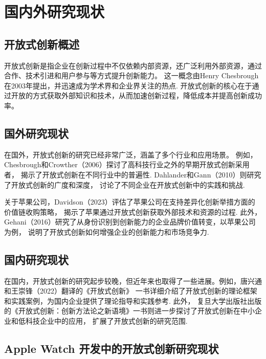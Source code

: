 \chapter{国内外研究现状}

\section{开放式创新概述}

开放式创新是指企业在创新过程中不仅依赖内部资源，还广泛利用外部资源，通过合作、技术引进和用户参与等方式提升创新能力。
这一概念由Henry Chesbrough在2003年提出，并迅速成为学术界和企业界关注的热点\citep{chesbrough_beyond_2006}.
 开放式创新的核心在于通过开放的方式获取外部知识和技术，从而加速创新过程，降低成本并提高创新成功率。

\section{国外研究现状}

在国外，开放式创新的研究已经非常广泛，涵盖了多个行业和应用场景。
例如，Chesbrough和Crowther（2006）探讨了高科技行业之外的早期开放式创新采用者，
揭示了开放式创新在不同行业中的普遍性\citep{chesbrough_beyond_2006}. Dahlander和Gann（2010）则研究了开放式创新的广度和深度，
讨论了不同企业在开放式创新中的实践和挑战\citep{dahlander_how_2010}.

关于苹果公司，Davidson（2023）评估了苹果公司在支持差异化创新举措方面的价值链收购策略，
揭示了苹果通过开放式创新获取外部技术和资源的过程\citep{davidson_assessing_2023}. 
此外，Gehani（2016）研究了从身份识别到创新能力的企业品牌价值转变，以苹果公司为例，
说明了开放式创新如何增强企业的创新能力和市场竞争力\citep{gehani2016corporate}.

\section{国内研究现状}

在国内，开放式创新的研究起步较晚，但近年来也取得了一些进展。例如，唐兴通和王崇锋（2022）翻译的《开放式创新》
一书详细介绍了开放式创新的理论框架和实践案例，为国内企业提供了理论指导和实践参考\citep{chesbrough2022}. 此外，
复旦大学出版社出版的《开放式创新：创新方法论之新语境》一书则进一步探讨了开放式创新在中小企业和低科技企业中的应用，
扩展了开放式创新的研究范围\citep{chesbrough2016}.

\section{Apple Watch 开发中的开放式创新研究现状}

